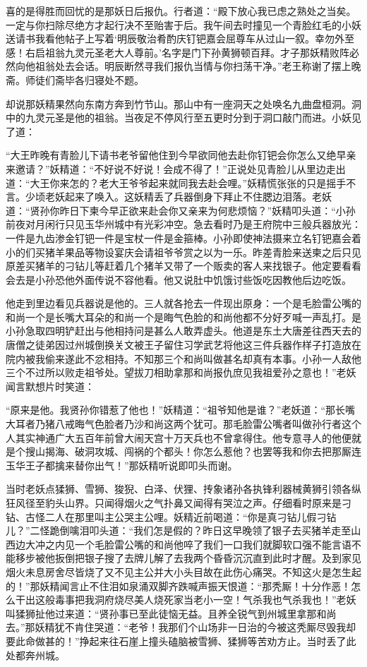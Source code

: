 \documentclass[12pt,UTF8]{ctexbook}
\begin{document}
{	喜的是得胜而回忧的是那妖日后报仇。行者道：“殿下放心我已虑之熟处之当矣。一定与你扫除尽绝方才起行决不至贻害于后。我午间去时撞见一个青脸红毛的小妖送请书我看他帖子上写着‘明辰敬治肴酌庆钉钯嘉会屈尊车从过山一叙。幸勿外至感！右启祖翁九灵元圣老大人尊前。’名字是门下孙黄狮顿百拜。才子那妖精败阵必然向他祖翁处去会话。明辰断然寻我们报仇当情与你扫荡干净。”老王称谢了摆上晚斋。师徒们斋毕各归寝处不题。
	
	却说那妖精果然向东南方奔到竹节山。那山中有一座洞天之处唤名九曲盘桓洞。洞中的九灵元圣是他的祖翁。当夜足不停风行至五更时分到于洞口敲门而进。小妖见了道：
	
	“大王昨晚有青脸儿下请书老爷留他住到今早欲同他去赴你钉钯会你怎么又绝早亲来邀请？”妖精道：“不好说不好说！会成不得了！”正说处见青脸儿从里边走出道：“大王你来怎的？老大王爷爷起来就同我去赴会哩。”妖精慌张张的只是摇手不言。少顷老妖起来了唤入。这妖精丢了兵器倒身下拜止不住腮边泪落。老妖道：“贤孙你昨日下柬今早正欲来赴会你又亲来为何悲烦恼？”妖精叩头道：“小孙前夜对月闲行只见玉华州城中有光彩冲空。急去看时乃是王府院中三般兵器放光：一件是九齿渗金钉钯一件是宝杖一件是金箍棒。小孙即使神法摄来立名钉钯嘉会着小的们买猪羊果品等物设宴庆会请祖爷爷赏之以为一乐。昨差青脸来送柬之后只见原差买猪羊的刁钻儿等赶着几个猪羊又带了一个贩卖的客人来找银子。他定要看看会去是小孙恐他外面传说不容他看。他又说肚中饥饿讨些饭吃因教他后边吃饭。
	
	他走到里边看见兵器说是他的。三人就各抢去一件现出原身：一个是毛脸雷公嘴的和尚一个是长嘴大耳朵的和尚一个是晦气色脸的和尚他都不分好歹喊一声乱打。是小孙急取四明铲赶出与他相持问是甚么人敢弄虚头。他道是东土大唐差往西天去的唐僧之徒弟因过州城倒换关文被王子留住习学武艺将他这三件兵器作样子打造放在院内被我偷来遂此不忿相持。不知那三个和尚叫做甚名却真有本事。小孙一人敌他三个不过所以败走祖爷处。望拔刀相助拿那和尚报仇庶见我祖爱孙之意也！”老妖闻言默想片时笑道：
	
	“原来是他。我贤孙你错惹了他也！”妖精道：“祖爷知他是谁？”老妖道：“那长嘴大耳者乃猪八戒晦气色脸者乃沙和尚这两个犹可。那毛脸雷公嘴者叫做孙行者这个人其实神通广大五百年前曾大闹天宫十万天兵也不曾拿得住。他专意寻人的他便就是个搜山揭海、破洞攻城、闯祸的个都头！你怎么惹他？也罢等我和你去把那厮连玉华王子都擒来替你出气！”那妖精听说即叩头而谢。
	
	当时老妖点猱狮、雪狮、狻猊、白泽、伏狸、抟象诸孙各执锋利器械黄狮引领各纵狂风径至豹头山界。只闻得烟火之气扑鼻又闻得有哭泣之声。仔细看时原来是刁钻、古怪二人在那里叫主公哭主公哩。妖精近前喝道：“你是真刁钻儿假刁钻儿？”二怪跪倒噙泪叩头道：“我们怎是假的？昨日这早晚领了银子去买猪羊走至山西边大冲之内见一个毛脸雷公嘴的和尚他啐了我们一口我们就脚软口强不能言语不能移步被他扳倒把银子搜了去牌儿解了去我两个昏昏沉沉直到此时才醒。及到家见烟火未息房舍尽皆烧了又不见主公并大小头目故在此伤心痛哭。不知这火是怎生起的！”那妖精闻言止不住泪如泉涌双脚齐跌喊声振天恨道：“那秃厮！十分作恶！怎么干出这般毒事把我洞府烧尽美人烧死家当老小一空！气杀我也气杀我也！”老妖叫猱狮扯他过来道：“贤孙事已至此徒恼无益。且养全锐气到州城里拿那和尚去。”那妖精犹不肯住哭道：“老爷！我那们个山场非一日治的今被这秃厮尽毁我却要此命做甚的！”挣起来往石崖上撞头磕脑被雪狮、猱狮等苦劝方止。当时丢了此处都奔州城。
	
}
\end{document}
